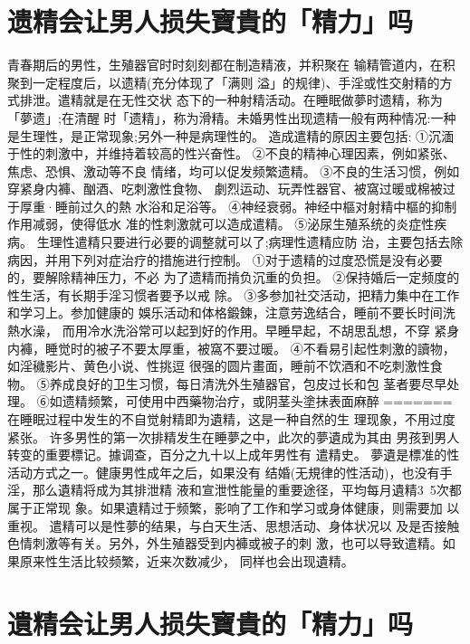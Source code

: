 \documentclass[12pt,UTF8]{ctexbook}
\begin{document}
\section{遗精会让男人损失寶貴的「精力」吗}

青春期后的男性，生殖器官时时刻刻都在制造精液，并积聚在
输精管道内，在积聚到一定程度后，以遗精(充分体现了「满则
溢」的规律)、手淫或性交射精的方式排泄。遣精就是在无性交状
态下的一种射精活动。在睡眠做夢时遗精，称为「夢遗」;在清醒
时「遗精」，称为滑精。未婚男性出现遗精一般有两种情况:一种
是生理性，是正常现象;另外一种是病理性的。
造成遣精的原因主要包括:
①沉湎于性的刺激中，并维持着较高的性兴奋性。
②不良的精神心理因素，例如紧张、焦虑、恐惧、激动等不良
情绪，均可以促发频繁遗精。
③不良的生活习惯，例如穿紧身内褲、酗酒、吃刺激性食物、
劇烈运动、玩弄性器官、被窩过暖或棉被过于厚重·睡前过久的熱
水浴和足浴等。
④神经衰弱。神经中樞对射精中樞的抑制作用减弱，使得低水
准的性刺激就可以造成遣精。
⑤泌尿生殖系统的炎症性疾病。
生理性遣精只要进行必要的调整就可以了;病理性遗精应防
治，主要包括去除病因，并用下列对症治疗的措施进行控制。
①对于遗精的过度恐慌是没有必要的，要解除精神压力，不必
为了遗精而掯负沉重的负担。
②保持婚后一定频度的性生活，有长期手淫习惯者要予以戒
除。
③多参加社交活动，把精力集中在工作和学习上。参加健康的
娛乐活动和体格鍛鍊，注意劳逸结合，睡前不要长时间洗熱水澡，
而用冷水洗浴常可以起到好的作用。早睡早起，不胡思乱想，不穿
紧身内褲，睡觉时的被子不要太厚重，被窩不要过暖。
④不看易引起性刺激的讀物，如淫穢影片、黄色小说、性挑逗
很强的圆片畫面，睡前不饮酒和不吃刺激性食物。
⑤养成良好的卫生习惯，每日清洗外生殖器官，包皮过长和包
茎者要尽早处理。
⑥如遗精频繁，可使用中西藥物治疗，或阴茎头塗抹表面麻醉
=======
在睡眠过程中发生的不自觉射精即为遺精，这是一种自然的生
理现象，不用过度紧张。
许多男性的第一次排精发生在睡夢之中，此次的夢遺成为其由
男孩到男人转变的重要標记。據调查，百分之九十以上成年男性有
遣精史。
夢遺是標准的性活动方式之一。健康男性成年之后，如果没有
结婚(无規律的性活动)，也没有手淫，那么遺精将成为其排泄精
液和宣泄性能量的重要途径，平均每月遺精3~5次都属于正常现
象。如果遺精过于频繁，影响了工作和学习或身体健康，则需要加
以重视。
遣精可以是性夢的结果，与白天生活、思想活动、身体状况以
及是否接触色情刺激等有关。另外，外生殖器受到内褲或被子的刺
激，也可以导致遣精。如果原来性生活比较频繁，近来次数减少，
同样也会出现遺精。

\section{遺精会让男人损失寶貴的「精力」吗}
\end{document}
